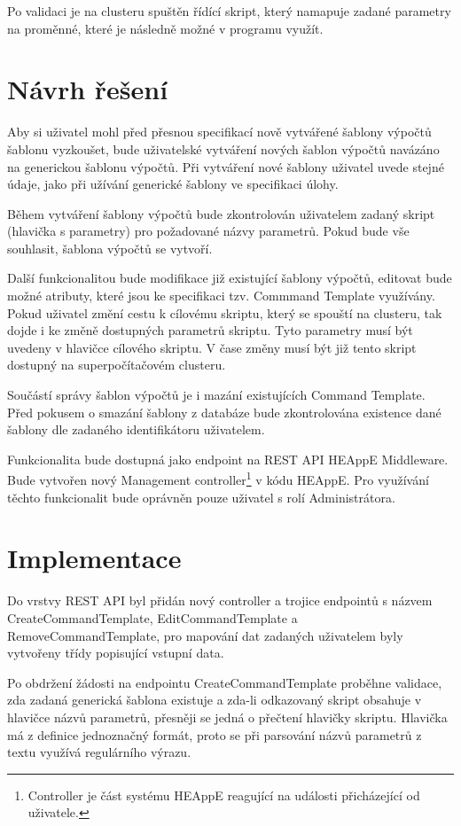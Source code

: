 Po validaci je na clusteru spuštěn řídící skript, který namapuje zadané parametry na proměnné, které je následně možné v programu využít.

\section{Návrh řešení}
Aby si uživatel mohl před přesnou specifikací nově vytvářené šablony výpočtů šablonu vyzkoušet, bude uživatelské vytváření nových šablon výpočtů navázáno na generickou šablonu výpočtů. Při vytváření nové šablony uživatel uvede stejné údaje, jako při užívání generické šablony ve specifikaci úlohy.

Během vytváření šablony výpočtů bude zkontrolován uživatelem zadaný skript (hlavička s parametry) pro požadované názvy parametrů. Pokud bude vše souhlasit, šablona výpočtů se vytvoří.

Další funkcionalitou bude modifikace již existující šablony výpočtů, editovat bude možné atributy, které jsou ke specifikaci tzv. Commmand Template využívány. Pokud uživatel změní cestu k cílovému skriptu, který se spouští na clusteru, tak dojde i ke změně dostupných parametrů skriptu. Tyto parametry musí být uvedeny v hlavičce cílového skriptu. V čase změny musí být již tento skript dostupný na superpočítačovém clusteru.

Součástí správy šablon výpočtů je i mazání existujících Command Template. Před pokusem o smazání šablony z databáze bude zkontrolována existence dané šablony dle zadaného identifikátoru uživatelem.

Funkcionalita bude dostupná jako endpoint na REST API HEAppE Middleware. Bude vytvořen nový Management controller\footnote{Controller je část systému HEAppE reagující na události přicházející od uživatele.} v kódu HEAppE. Pro využívání těchto funkcionalit bude oprávněn pouze uživatel s rolí Administrátora.

\section{Implementace}
Do vrstvy REST API byl přidán nový controller a trojice endpointů s názvem CreateCommandTemplate, EditCommandTemplate a RemoveCommandTemplate, pro mapování dat zadaných uživatelem byly vytvořeny třídy popisující vstupní data. 

Po obdržení žádosti na endpointu CreateCommandTemplate proběhne validace, zda zadaná generická šablona existuje a zda-li odkazovaný skript obsahuje v hlavičce názvů parametrů, přesněji se jedná o přečtení hlavičky skriptu. Hlavička má z definice jednoznačný formát, proto se při parsování názvů parametrů z textu využívá regulárního výrazu.


